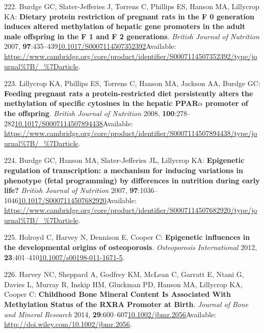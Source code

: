 \documentclass[
]{book}
\begin{document}
\leavevmode\hypertarget{ref-Burdge2007a}{}%
222. Burdge GC, Slater-Jefferies J, Torrens C, Phillips ES, Hanson MA, Lillycrop KA: \textbf{Dietary protein restriction of pregnant rats in the F 0 generation induces altered methylation of hepatic gene promoters in the adult male offspring in the F 1 and F 2 generations}. \emph{British Journal of Nutrition} 2007, \textbf{97}:435--439\href{https://doi.org/10.1017/S0007114507352392}{10.1017/S0007114507352392}Available: \url{https://www.cambridge.org/core/product/identifier/S0007114507352392/type/journal\%7B/_\%7Darticle}.

\leavevmode\hypertarget{ref-Lillycrop2008}{}%
223. Lillycrop KA, Phillips ES, Torrens C, Hanson MA, Jackson AA, Burdge GC: \textbf{Feeding pregnant rats a protein-restricted diet persistently alters the methylation of specific cytosines in the hepatic PPAR\(\alpha\) promoter of the offspring}. \emph{British Journal of Nutrition} 2008, \textbf{100}:278--282\href{https://doi.org/10.1017/S0007114507894438}{10.1017/S0007114507894438}Available: \url{https://www.cambridge.org/core/product/identifier/S0007114507894438/type/journal\%7B/_\%7Darticle}.

\leavevmode\hypertarget{ref-Burdge2007}{}%
224. Burdge GC, Hanson MA, Slater-Jefferies JL, Lillycrop KA: \textbf{Epigenetic regulation of transcription: a mechanism for inducing variations in phenotype (fetal programming) by differences in nutrition during early life?} \emph{British Journal of Nutrition} 2007, \textbf{97}:1036--1046\href{https://doi.org/10.1017/S0007114507682920}{10.1017/S0007114507682920}Available: \url{https://www.cambridge.org/core/product/identifier/S0007114507682920/type/journal\%7B/_\%7Darticle}.

\leavevmode\hypertarget{ref-Holroyd2012}{}%
225. Holroyd C, Harvey N, Dennison E, Cooper C: \textbf{Epigenetic influences in the developmental origins of osteoporosis}. \emph{Osteoporosis International} 2012, \textbf{23}:401--410\href{https://doi.org/10.1007/s00198-011-1671-5}{10.1007/s00198-011-1671-5}.

\leavevmode\hypertarget{ref-Harvey2014d}{}%
226. Harvey NC, Sheppard A, Godfrey KM, McLean C, Garratt E, Ntani G, Davies L, Murray R, Inskip HM, Gluckman PD, Hanson MA, Lillycrop KA, Cooper C: \textbf{Childhood Bone Mineral Content Is Associated With Methylation Status of the RXRA Promoter at Birth}. \emph{Journal of Bone and Mineral Research} 2014, \textbf{29}:600--607\href{https://doi.org/10.1002/jbmr.2056}{10.1002/jbmr.2056}Available: \url{http://doi.wiley.com/10.1002/jbmr.2056}.
\end{document}
